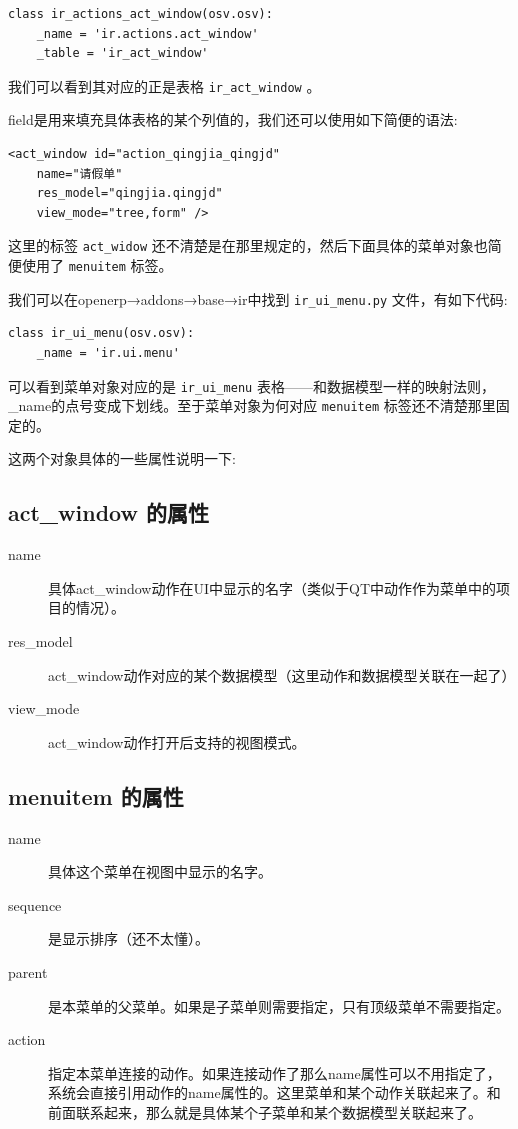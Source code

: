 \documentclass[11pt,a4paper]{sphinxmanual}
\begin{document}
\begin{Verbatim}
class ir_actions_act_window(osv.osv):
    _name = 'ir.actions.act_window'
    _table = 'ir_act_window'
\end{Verbatim}

我们可以看到其对应的正是表格 \verb~ir_act_window~ 。

field是用来填充具体表格的某个列值的，我们还可以使用如下简便的语法:
\begin{Verbatim}
<act_window id="action_qingjia_qingjd"
    name="请假单"
    res_model="qingjia.qingjd"
    view_mode="tree,form" />
\end{Verbatim}

这里的标签 \verb~act_widow~ 还不清楚是在那里规定的，然后下面具体的菜单对象也简便使用了 \verb~menuitem~ 标签。

我们可以在openerp→addons→base→ir中找到 \verb~ir_ui_menu.py~ 文件，有如下代码:

\begin{Verbatim}
class ir_ui_menu(osv.osv):
    _name = 'ir.ui.menu'
\end{Verbatim}

可以看到菜单对象对应的是 \verb~ir_ui_menu~ 表格——和数据模型一样的映射法则，\_name的点号变成下划线。至于菜单对象为何对应 \verb~menuitem~ 标签还不清楚那里固定的。

这两个对象具体的一些属性说明一下:

\subsection{act\_window 的属性}
\label{sec-6-3-1}
\begin{description}
\item[{name}] 具体act\_window动作在UI中显示的名字（类似于QT中动作作为菜单中的项目的情况）。
\item[{res\_model}] act\_window动作对应的某个数据模型（这里动作和数据模型关联在一起了）
\item[{view\_mode}] act\_window动作打开后支持的视图模式。
\end{description}


\subsection{menuitem 的属性}
\label{sec-6-3-2}
\begin{description}
\item[{name}] 具体这个菜单在视图中显示的名字。
\item[{sequence}] 是显示排序（还不太懂）。
\item[{parent}] 是本菜单的父菜单。如果是子菜单则需要指定，只有顶级菜单不需要指定。
\item[{action}] 指定本菜单连接的动作。如果连接动作了那么name属性可以不用指定了，系统会直接引用动作的name属性的。这里菜单和某个动作关联起来了。和前面联系起来，那么就是具体某个子菜单和某个数据模型关联起来了。
\end{description}
\end{document}
